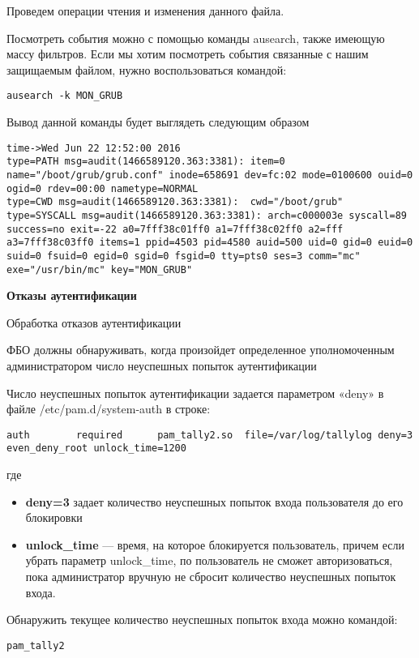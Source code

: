 \documentclass[a4paper,10pt,twoside]{article}
\begin{document}
Проведем операции чтения и изменения данного файла.

Посмотреть события можно с помощью команды ausearch, также имеющую массу фильтров. Если  мы хотим посмотреть события связанные с нашим защищаемым файлом, нужно воспользоваться командой:
\begin{verbatim}
ausearch -k MON_GRUB
\end{verbatim} 

Вывод данной команды будет выглядеть следующим образом 
\begin{verbatim}
time->Wed Jun 22 12:52:00 2016
type=PATH msg=audit(1466589120.363:3381): item=0 name="/boot/grub/grub.conf" inode=658691 dev=fc:02 mode=0100600 ouid=0 ogid=0 rdev=00:00 nametype=NORMAL
type=CWD msg=audit(1466589120.363:3381):  cwd="/boot/grub"
type=SYSCALL msg=audit(1466589120.363:3381): arch=c000003e syscall=89 success=no exit=-22 a0=7fff38c01ff0 a1=7fff38c02ff0 a2=fff a3=7fff38c03ff0 items=1 ppid=4503 pid=4580 auid=500 uid=0 gid=0 euid=0 suid=0 fsuid=0 egid=0 sgid=0 fsgid=0 tty=pts0 ses=3 comm="mc" exe="/usr/bin/mc" key="MON_GRUB"
\end{verbatim} 

 \textbf{Отказы аутентификации}

Обработка отказов аутентификации

ФБО должны обнаруживать, когда произойдет определенное уполномоченным администратором число неуспешных попыток аутентификации

Число неуспешных попыток аутентификации задается параметром «deny» в файле /etc/pam.d/system-auth в строке:
\begin{verbatim}
auth        required      pam_tally2.so  file=/var/log/tallylog deny=3 even_deny_root unlock_time=1200
\end{verbatim} 
где 
\begin{itemize}
\item \textbf{deny=3} задает количество неуспешных попыток входа пользователя до его блокировки
\item \textbf{unlock\_time} — время, на которое блокируется пользователь, причем если убрать параметр unlock\_time, по пользователь не сможет авторизоваться, пока администратор вручную не сбросит количество неуспешных попыток входа.
\end{itemize}


Обнаружить текущее количество неуспешных попыток входа можно командой:
\begin{verbatim}
pam_tally2
\end{verbatim} 
\end{document}
